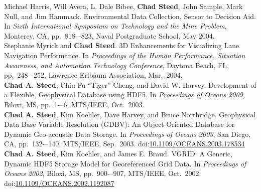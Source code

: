 \documentclass[11pt, letterpaper]{article}
\newcommand{\years}[1]{\marginnote{\scriptsize #1}}
\begin{document}
\begin{sloppypar}
\years{2004}Michael Harris, Will Avera, L. Dale Bibee, \textbf{Chad Steed},
John Sample, Mark Null, and Jim Hammack.  Environmental Data Collection,
Sensor to Decision Aid.  In \emph{Sixth International Symposium on Technology
and the Mine Problem}, Monterey, CA, pp.\ 818–-823, Naval Postgraduate
School, May 2004.\\
\years{2004}Stephanie Myrick and \textbf{Chad Steed}.  3D Enhancements for
Visualizing Lane Navigation Performance.  In \emph{Proceedings of the Human
Performance, Situation Awareness, and Automation Technology Conference},
Daytona Beach, FL, pp.\ 248–-252, Lawrence Erlbaum Association, Mar.\ 2004.\\
\years{2003}\textbf{Chad A. Steed}, Chiu-Fu ``Tiger'' Cheng, and David W.
Harvey.  Development of a Flexible, Geophysical Database using HDF5.  In
\emph{Proceedings of Oceans 2009}, Biloxi, MS, pp.\ 1-–6, MTS/IEEE, Oct.\ 2003.\\
\years{2003}\textbf{Chad A. Steed}, Kim Koehler, Dave Harvey, and Bruce
Northridge.  Geophysical Data Base Variable Resolution (GDBV): An
Object-Oriented Database for Dynamic Geo-acoustic Data Storage.  In
\emph{Proceedings of Oceans 2003}, San Diego, CA, pp.\ 132-–140, MTS/IEEE,
Sep.\ 2003. doi:\href{http://dx.doi.org/10.1109/OCEANS.2003.178534}
{10.1109/OCEANS.2003.178534}\\
\years{2002}\textbf{Chad A. Steed}, Kim Koehler, and James E. Braud.
VGRID: A Generic, Dynamic HDF5 Storage Model for Georeferenced Grid Data.
In \emph{Proceedings of Oceans 2002}, Biloxi, MS, pp.\ 900-–907,
MTS/IEEE, Oct.\ 2002. doi:\href{http://dx.doi.org/10.1109/OCEANS.2002.1192087}
{10.1109/OCEANS.2002.1192087}
\end{sloppypar}
\end{document}
